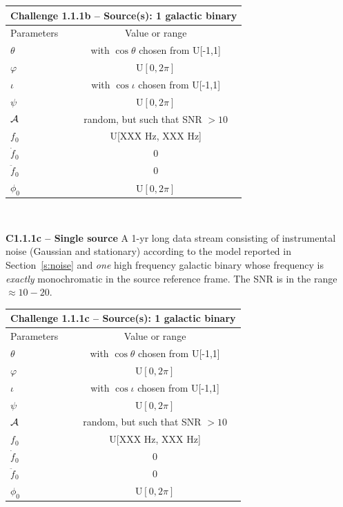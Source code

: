 \documentclass[11pt]{report}
\begin{document}
\begin{description}
\begin{center}
\begin{tabular}{l|c}
\hline \hline
\multicolumn{2}{c}{{\bf Challenge 1.1.1b -- Source(s): 1 galactic binary}} \\
\hline
Parameters & Value or range \\
\hline
$\theta$          & with $\cos\theta$ chosen from U[-1,1]\\
$\varphi$         & U$[0,2\pi]$ \\ 
$\iota$           & with $\cos\iota$ chosen from U[-1,1]\\ 
$\psi$            & U$[0,2\pi]$ \\
${\cal A}$        & random, but such that SNR $> 10$ \\
$f_0$             & U[XXX Hz, XXX Hz] \\ 
$\dot{f}_0$       & 0 \\ 
$\ddot{f}_0$      & 0\\ 
$\phi_0$          & U$[0,2\pi]$ \\
\hline \hline
\end{tabular} \\
\end{center}

\item {\bf C1.1.1c -- Single source} A 1-yr long data stream consisting of instrumental noise (Gaussian and stationary) according to the model reported in Section~\ref{s:noise} and {\em one} high frequency galactic binary whose frequency is {\em exactly} monochromatic in the source reference frame. The SNR is in the range $\approx 10-20$. 

\begin{center}
\begin{tabular}{l|c}
\hline \hline
\multicolumn{2}{c}{{\bf Challenge 1.1.1c -- Source(s): 1 galactic binary}} \\
\hline
Parameters & Value or range \\
\hline
$\theta$          & with $\cos\theta$ chosen from U[-1,1]\\
$\varphi$         & U$[0,2\pi]$ \\ 
$\iota$           & with $\cos\iota$ chosen from U[-1,1]\\ 
$\psi$            & U$[0,2\pi]$ \\
${\cal A}$        & random, but such that SNR $> 10$ \\
$f_0$             & U[XXX Hz, XXX Hz] \\ 
$\dot{f}_0$       & 0 \\ 
$\ddot{f}_0$      & 0\\ 
$\phi_0$          & U$[0,2\pi]$ \\
\hline \hline
\end{tabular} \\
\end{center}



\end{description}
\end{document}
